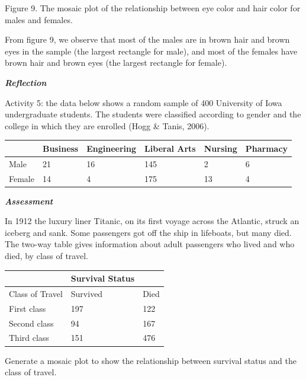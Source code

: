 Figure 9. The mosaic plot of the relationship between eye color and hair
color for males and females.

From figure 9, we observe that most of the males are in brown hair and
brown eyes in the sample (the largest rectangle for male), and most of
the females have brown hair and brown eyes (the largest rectangle for
female).

\emph{\textbf{Reflection}}

Activity 5: the data below shows a random sample of 400 University of
Iowa undergraduate students. The students were classified according to
gender and the college in which they are enrolled (Hogg \& Tanis, 2006).

\begin{longtable}[]{@{}llllll@{}}
\toprule
& Business & Engineering & Liberal Arts & Nursing &
Pharmacy\tabularnewline
\midrule
\endhead
Male & 21 & 16 & 145 & 2 & 6\tabularnewline
Female & 14 & 4 & 175 & 13 & 4\tabularnewline
\bottomrule
\end{longtable}

\emph{\textbf{Assessment}}

In 1912 the luxury liner Titanic, on its first voyage across the
Atlantic, struck an iceberg and sank. Some passengers got off the ship
in lifeboats, but many died. The two-way table gives information about
adult passengers who lived and who died, by class of travel.

\begin{longtable}[]{@{}lll@{}}
\toprule
& Survival Status &\tabularnewline
\midrule
\endhead
Class of Travel & Survived & Died\tabularnewline
First class & 197 & 122\tabularnewline
Second class & 94 & 167\tabularnewline
Third class & 151 & 476\tabularnewline
\bottomrule
\end{longtable}

Generate a mosaic plot to show the relationship between survival status
and the class of travel.
